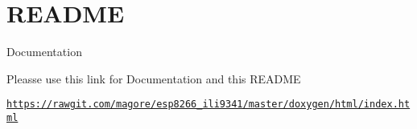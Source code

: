 \hypertarget{index_README}{}\section{R\+E\+A\+D\+ME}\label{index_README}
\begin{DoxyParagraph}{Documentation}

\end{DoxyParagraph}

\begin{DoxyItemize}
\item Pleasse use this link for Documentation and this R\+E\+A\+D\+ME
\begin{DoxyItemize}
\item \href{https://rawgit.com/magore/esp8266_ili9341/master/doxygen/html/index.html}{\tt https\+://rawgit.\+com/magore/esp8266\+\_\+ili9341/master/doxygen/html/index.\+html}
\end{DoxyItemize}
\end{DoxyItemize}

